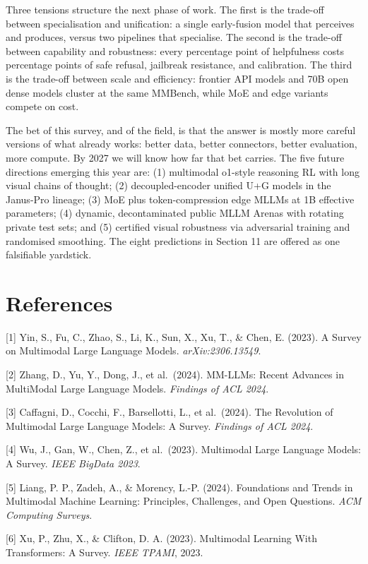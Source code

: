 Three tensions structure the next phase of work. The first is the trade-off between specialisation and unification: a single early-fusion model that perceives and produces, versus two pipelines that specialise. The second is the trade-off between capability and robustness: every percentage point of helpfulness costs percentage points of safe refusal, jailbreak resistance, and calibration. The third is the trade-off between scale and efficiency: frontier API models and 70B open dense models cluster at the same MMBench, while MoE and edge variants compete on cost.

The bet of this survey, and of the field, is that the answer is mostly more careful versions of what already works: better data, better connectors, better evaluation, more compute. By 2027 we will know how far that bet carries. The five future directions emerging this year are: (1) multimodal o1-style reasoning RL with long visual chains of thought; (2) decoupled-encoder unified U+G models in the Janus-Pro lineage; (3) MoE plus token-compression edge MLLMs at 1B effective parameters; (4) dynamic, decontaminated public MLLM Arenas with rotating private test sets; and (5) certified visual robustness via adversarial training and randomised smoothing. The eight predictions in Section 11 are offered as one falsifiable yardstick.

\section{References}\label{references}

{[}1{]} Yin, S., Fu, C., Zhao, S., Li, K., Sun, X., Xu, T., \& Chen, E. (2023). A Survey on Multimodal Large Language Models. \emph{arXiv:2306.13549}.

{[}2{]} Zhang, D., Yu, Y., Dong, J., et al.~(2024). MM-LLMs: Recent Advances in MultiModal Large Language Models. \emph{Findings of ACL 2024}.

{[}3{]} Caffagni, D., Cocchi, F., Barsellotti, L., et al.~(2024). The Revolution of Multimodal Large Language Models: A Survey. \emph{Findings of ACL 2024}.

{[}4{]} Wu, J., Gan, W., Chen, Z., et al.~(2023). Multimodal Large Language Models: A Survey. \emph{IEEE BigData 2023}.

{[}5{]} Liang, P. P., Zadeh, A., \& Morency, L.-P. (2024). Foundations and Trends in Multimodal Machine Learning: Principles, Challenges, and Open Questions. \emph{ACM Computing Surveys}.

{[}6{]} Xu, P., Zhu, X., \& Clifton, D. A. (2023). Multimodal Learning With Transformers: A Survey. \emph{IEEE TPAMI}, 2023.


